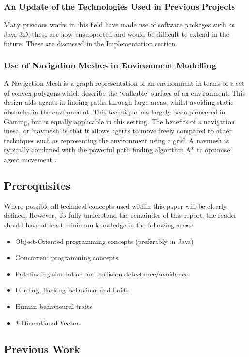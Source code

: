 \documentclass[a4paper,10pt]{article}
\begin{document}
\subsubsection{An Update of the Technologies Used in Previous Projects}
Many previous works in this field have made use of software packages such as Java 3D; these are now unsupported and 
would be difficult to extend in the future.
These are discussed in the Implementation section.

\subsubsection{Use of Navigation Meshes in Environment Modelling}
A Navigation Mesh is a graph representation of an environment in terms of a set of convex polygons which describe the `walkable' surface of an environment. This design aids agents in finding paths through large areas, whilst avoiding static obstacles in the environment.
This technique has largely been pioneered in Gaming, but is equally applicable in this setting. The benefits of a navigation mesh, or 'navmesh' is that it allows agents to move 
freely compared to other techniques such as representing the environment using a grid. A navmesh is typically combined with the powerful path finding algorithm A* to 
optimise agent movement \cite{A*Review}.

\subsection{Prerequisites}
Where possible all technical concepts used within this paper will be clearly defined. However, To fully understand the remainder of this report, the reader should have at least
minimum knowledge in the following areas:
\begin{itemize}
 \item Object-Oriented programming concepts (preferably in Java)
 \item Concurrent programming concepts
 \item Pathfinding simulation and collision detectance/avoidance~\cite{gameProgramming}~\cite{collisionDetection}
 \item Herding, flocking behaviour and boids~\cite{HAndBoid}~\cite{Fbehavior}
 \item Human behavioural traits~\cite{HumanBehaviouralTraits}
 \item 3 Dimentional Vectors
\end{itemize}

\subsection{Previous Work}
\end{document}
